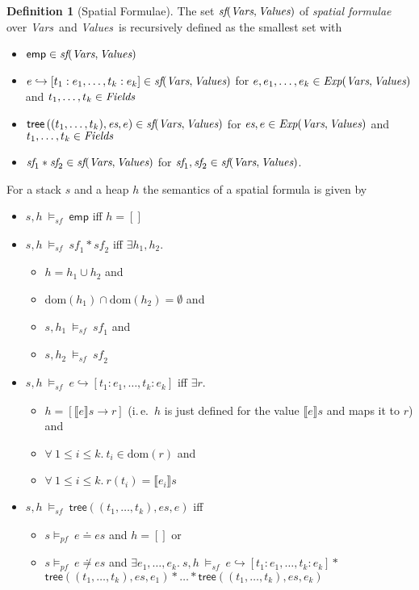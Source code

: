 \documentclass{scrartcl}
\theoremstyle{definition}
\newtheorem{definition}{Definition}
\newcommand{\pfequal}[2]{\ensuremath{#1 \doteq #2}}
\newcommand{\pfunequal}[2]{\ensuremath{#1 \not\doteq #2}}
\newcommand{\values}{{\emph{Values}}}
\newcommand{\vars}{{\emph{Vars}}}
\newcommand{\expr}{{\emph{Exp}}}
\newcommand{\fields}{{\emph{Fields}}}
\newcommand{\sfset}{{\emph{sf}}}
\newcommand{\modelspf}{{\models_{\textit{pf}}\ }}
\newcommand{\modelssf}{{\models_{\textit{sf}}\ }}
\newcommand{\sfemp}{{\textsf{emp}}}
\newcommand{\sftree}{{\textsf{tree}}}
\newcommand{\sfpointsto}[2]{#1 \hookrightarrow [#2]}
\newcommand{\dom}{{\text{dom}}}
\begin{document}
\begin{definition}[Spatial Formulae]
  The set $\sfset(\vars,\values)$ of \emph{spatial formulae} over \vars\ and
  \values\ is recursively defined as the smallest set with
\begin{itemize}
\item $\sfemp \in \sfset(\vars,\values)$
\item $\sfpointsto{e}{t_1:e_1, \ldots, t_k:e_k} \in \sfset(\vars,\values)$ for 
  $e, e_1, \ldots, e_k \in  \expr(\vars,\values)$ and $t_1, \ldots, t_k \in \fields$
\item $\sftree\left((t_1, \ldots, t_k),\textit{es},e\right) \in \sfset(\vars,\values)$
  for $\textit{es}, e \in \expr(\vars,\values)$ and\\$t_1, \ldots, t_k \in \fields$
\item $\textit{sf}_1 * \textit{sf}_2 \in \sfset(\vars,\values)$ for
  $\textit{sf}_1, \textit{sf}_2 \in \sfset(\vars,\values)$.
\end{itemize}
\bigskip
%
For a stack $s$ and a heap $h$ the semantics of a spatial formula is given by
\begin{itemize}
\item $s, h\ \modelssf \sfemp$ iff $h = []$
\item $s, h\ \modelssf \textit{sf}_1 * \textit{sf}_2$ iff $\exists h_1, h_2.$
  \begin{itemize}
  \item $h = h_1 \cup h_2$ and 
  \item $\dom(h_1) \cap \dom(h_2) = \emptyset$ and
  \item $s, h_1\ \modelssf \textit{sf}_1$ and
  \item $s, h_2\ \modelssf \textit{sf}_2$
  \end{itemize}
\item $s, h\ \modelssf \sfpointsto{e}{t_1:e_1, \ldots, t_k:e_k}$ iff $\exists r.$
  \begin{itemize}
  \item $h = \left[ \llbracket e \rrbracket s \to r \right]$ (i.\,e.\ $h$ is
    just defined for the value $\llbracket e \rrbracket s$ and maps it to $r$) and
  \item $\forall\ 1 \leq i \leq k.\ t_i \in \dom(r)$ and
  \item $\forall\ 1 \leq i \leq k.\ r(t_i) = \llbracket e_i \rrbracket s$
  \end{itemize}
\item $s, h\ \modelssf \sftree\left((t_1, \ldots, t_k),\textit{es},e\right)$ iff 
\begin{itemize}
  \item $s \modelspf \pfequal{e}{es}$ and $h = []$ or
  \item $s \modelspf \pfunequal{e}{es}$ and $\exists
  e_1, \ldots, e_k.\ s, h\ \modelssf \sfpointsto{e}{t_1:e_1, \ldots, t_k:e_k}
  *$\\$\sftree\left((t_1, \ldots, t_k),\textit{es},e_1\right) * \ldots * \sftree\left((t_1,
  \ldots, t_k),\textit{es},e_k\right)$ 
\end{itemize}
\end{itemize}
\end{definition}
\end{document}

